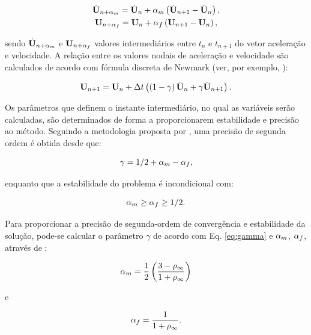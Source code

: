 \documentclass[tese_patricia]{subfiles}%
\begin{document}
\begin{gather}
\dot{\mathbf{U}}_{n+\alpha_m} = \dot{\mathbf{U}}_n + \alpha_m \left( \dot{\mathbf{U}}_{n+1} - \dot{\mathbf{U}}_n \right), \label{eq:approx_acceleration}\\
\mathbf{U}_{n+\alpha_f} = \mathbf{U}_n + \alpha_f \left( \mathbf{U}_{n+1} - \mathbf{U}_n \right), \label{eq:approx_velocity}
\end{gather}

\noindent sendo $\dot{\mathbf{U}}_{n+\alpha_m}$ e $\mathbf{U}_{n+\alpha_f}$ valores intermediários entre $t_{n}$ e $t_{n+1}$ do vetor aceleração e velocidade. A relação entre os valores nodais de aceleração e velocidade são calculados de acordo com fórmula discreta de Newmark (ver, por exemplo, \cite{Hughes:1976}):

\begin{gather}
\mathbf{U}_{n+1} = \mathbf{U}_n + \Delta t\left(\left(1-\gamma\right)\dot{\mathbf{U}}_n + \gamma\dot{\mathbf{U}}_{n+1} \right). \label{eq:newmark}
\end{gather}

Os parâmetros que definem o instante intermediário, no qual as variáveis serão calculadas, são determinados de forma a proporcionarem estabilidade e precisão ao método. Seguindo a metodologia proposta por , uma precisão de segunda ordem é obtida desde que: 

\begin{gather}
\gamma = 1/2 + \alpha_m - \alpha_f,\label{eq:gamma}
\end{gather}

\noindent enquanto que a estabilidade do problema é incondicional com:

\begin{gather}
\alpha_m \ge \alpha_f \ge 1/2.
\end{gather}

Para proporcionar a precisão de segunda-ordem de convergência e estabilidade da solução, pode-se calcular o parâmetro $\gamma$ de acordo com Eq. \ref {eq:gamma} e $\alpha_m$, $\alpha_f$, através de \cite{Hughes:2000}:


\begin{gather}
\alpha_m = \frac{1}{2}\left(\frac{3 - \rho_\infty}{1+\rho_\infty}\right)\label{eq:alpha_m_fluid}\\
\end{gather}

\noindent e

\begin{gather}
\alpha_f = \frac{1}{1+\rho_\infty}\label{eq:alpha_f_fluid}.
\end{gather}
\end{document}
